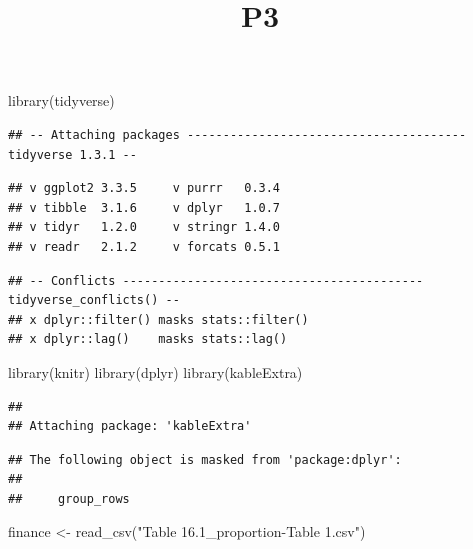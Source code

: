 \documentclass[
]{article}
\title{P3}
\author{}
\date{\vspace{-2.5em}}
\newenvironment{Shaded}{\begin{snugshade}}{\end{snugshade}}
\newcommand{\FunctionTok}[1]{\textcolor[rgb]{0.00,0.00,0.00}{#1}}
\newcommand{\NormalTok}[1]{#1}
\newcommand{\OtherTok}[1]{\textcolor[rgb]{0.56,0.35,0.01}{#1}}
\newcommand{\StringTok}[1]{\textcolor[rgb]{0.31,0.60,0.02}{#1}}
\begin{document}
\maketitle

\begin{Shaded}
\begin{Highlighting}[]
\FunctionTok{library}\NormalTok{(tidyverse)}
\end{Highlighting}
\end{Shaded}

\begin{verbatim}
## -- Attaching packages --------------------------------------- tidyverse 1.3.1 --
\end{verbatim}

\begin{verbatim}
## v ggplot2 3.3.5     v purrr   0.3.4
## v tibble  3.1.6     v dplyr   1.0.7
## v tidyr   1.2.0     v stringr 1.4.0
## v readr   2.1.2     v forcats 0.5.1
\end{verbatim}

\begin{verbatim}
## -- Conflicts ------------------------------------------ tidyverse_conflicts() --
## x dplyr::filter() masks stats::filter()
## x dplyr::lag()    masks stats::lag()
\end{verbatim}

\begin{Shaded}
\begin{Highlighting}[]
\FunctionTok{library}\NormalTok{(knitr)}
\FunctionTok{library}\NormalTok{(dplyr)}
\FunctionTok{library}\NormalTok{(kableExtra)}
\end{Highlighting}
\end{Shaded}

\begin{verbatim}
## 
## Attaching package: 'kableExtra'
\end{verbatim}

\begin{verbatim}
## The following object is masked from 'package:dplyr':
## 
##     group_rows
\end{verbatim}

\begin{Shaded}
\begin{Highlighting}[]
\NormalTok{finance }\OtherTok{\textless{}{-}} \FunctionTok{read\_csv}\NormalTok{(}\StringTok{"Table 16.1\_proportion{-}Table 1.csv"}\NormalTok{)}
\end{Highlighting}
\end{Shaded}
\end{document}
